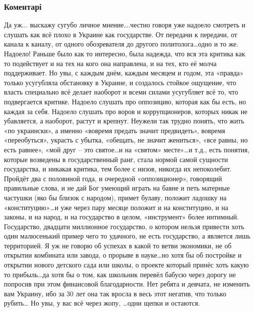  
 
 
 
 
\subsubsection{Коментарі}
\label{sec:13_10_2021.fb.medvedeva_olesja.1.igra_v_kalmara_ukraina.cmt}

\begin{itemize} %

Да уж... выскажу сугубо личное мнение….честно говоря уже надоело смотреть и
слушать как всё плохо в Украине как государстве. От передачи к передачи, от
канала к каналу, от одного обозревателя до другого политолога…одно и то же.
Надоело! Раньше было как то интересно, была надежда, что вся эта критика как то
подействует и на тех на кого она направлена, и на тех, кто её молча
поддерживает. Но увы, с каждым днём, каждым месяцем и годом, эта «правда»
только усугубляла обстановку в Украине, и создалось стойкое ощущение, что
власть специально всё делает наоборот и всеми силами усугубляет всё то, что
подвергается критике. Надоело слушать про оппозицию, которая как бы есть, но
каждая за себя. Надоело слушать про воров и коррупционеров, которых никак не
убавляется, а наоборот, растут и крепнут. Неужели так трудно понять, что жить
«по украински», а именно «вовремя предать значит предвидеть», вовремя
«переобуться», украсть с убытка, «обещать, не значит жениться», «все равны, но
есть равнее», «мой друг – это святое…и на «святом» месте»…и т.д., есть понятия,
которые возведены в государственный ранг, стала нормой самой сущности
государства, и никакая критика, тем более с низов, никогда их непоколебит.
Пройдёт два с половиной года, и очередной «оппозиционер», говорящий правильные
слова, и не дай Бог умеющий играть на баяне и петь матерные частушки (яко бы
близок с народом), примет булаву, положит ладошку на «конституцию»…и уже через
пару месяце положит и на конституцию, и на законы, и на народ, и на государство
в целом, «инструмент» более интимный. Государство, двадцати миллионное
государство, о котором нельзя привести хоть один малюсенький пример чего то
удачного, не есть государство, а является лишь территорией. Я уж не говорю об
успехах в какой то ветви экономики, не об открытии комбината или завода, о
прорыве в науке…но хотя бы об постройке и открытии нового детского сада или
школы, о проекте который принёс хоть какую то прибыль…да хотя бы о том, как
школьник перевёл бабусю через дорогу не попросив при этом финансовой
благодарности. Нет ребята и девчата, не изменить вам Украину, ибо за 30 лет она
так вросла в весь этот негатив, что только рубить… Но увы, у вас всё через
жопу, …одни щепки и остаются.


\end{itemize}
